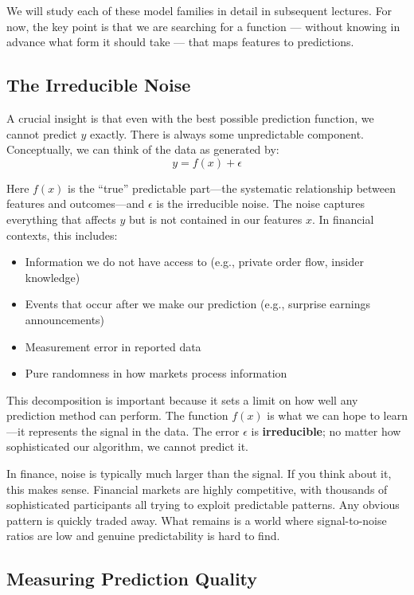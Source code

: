 \documentclass[11pt,a4paper]{article}
\newcommand{\keyword}[1]{\textbf{\textcolor{AccentOrange}{#1}}}
\begin{document}
We will study each of these model families in detail in subsequent lectures. For now, the key point is that we are searching for a function — without knowing in advance what form it should take — that maps features to predictions.

\subsection{The Irreducible Noise}

A crucial insight is that even with the best possible prediction function, we cannot predict $y$ exactly. There is always some unpredictable component. Conceptually, we can think of the data as generated by:
\[
y = f(x) + \epsilon
\]

Here $f(x)$ is the ``true'' predictable part---the systematic relationship between features and outcomes---and $\epsilon$ is the irreducible noise. The noise captures everything that affects $y$ but is not contained in our features $x$. In financial contexts, this includes:

\begin{itemize}
    \item Information we do not have access to (e.g., private order flow, insider knowledge)
    \item Events that occur after we make our prediction (e.g., surprise earnings announcements)
    \item Measurement error in reported data
    \item Pure randomness in how markets process information
\end{itemize}

This decomposition is important because it sets a limit on how well any prediction method can perform. The function $f(x)$ is what we can hope to learn---it represents the signal in the data. The error $\epsilon$ is \keyword{irreducible}; no matter how sophisticated our algorithm, we cannot predict it. 

In finance, noise is typically much larger than the signal. If you think about it, this makes sense. Financial markets are highly competitive, with thousands of sophisticated participants all trying to exploit predictable patterns. Any obvious pattern is quickly traded away. What remains is a world where signal-to-noise ratios are low and genuine predictability is hard to find.

\subsection{Measuring Prediction Quality}
\end{document}
